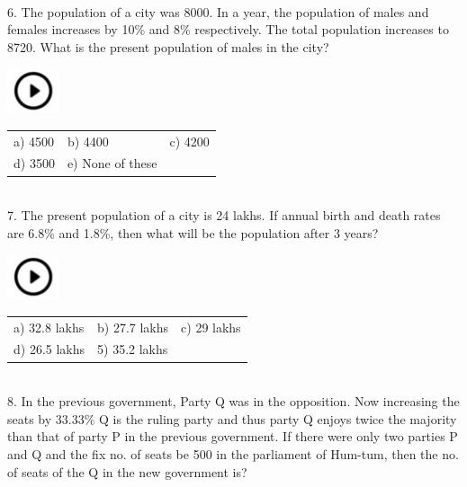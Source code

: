 \documentclass{article}
\begin{document}
\noindent \\
6.   The population of a city was 8000. In a year, the population of males and females increases by 10\% and 8\% respectively. The total population increases to 8720. What is the present population of males in the city?

\noindent 

\noindent   \includegraphics*[width=0.60in, height=0.52in]{images/image1}
\begin{tabular}{p{1.7in} p{1.6in} p{1.6in}} \\ 
 a) 4500               &    b) 4400       &     c) 4200              \\
	d) 3500        &   e) None of these
	 \\
\end{tabular}  
                                            
\noindent 
\newpage
\noindent \\
7.   The present population of a city is 24 lakhs. If annual birth and death rates are 6.8\% and 1.8\%, then what will be the population after 3 years?

\noindent   \includegraphics*[width=0.60in, height=0.52in]{images/image1} 
\begin{tabular}{p{1.7in} p{1.6in} p{1.6in}} \\ 
a) 32.8 lakhs         &   b) 27.7 lakhs        &     c) 29 lakhs           \\
d) 26.5 lakhs     &  5) 35.2 lakhs \\
\end{tabular}
                     

\noindent 

\noindent 

\noindent \\
 8.   In the previous government, Party Q was in the opposition. Now increasing the seats by 33.33\% Q is the ruling party and thus party Q enjoys twice the majority than that of party P in the previous government. If there were only two parties P and Q and the fix no. of seats be 500 in the parliament of Hum-tum, then the no. of seats of the Q in the new government is?
\end{document}
